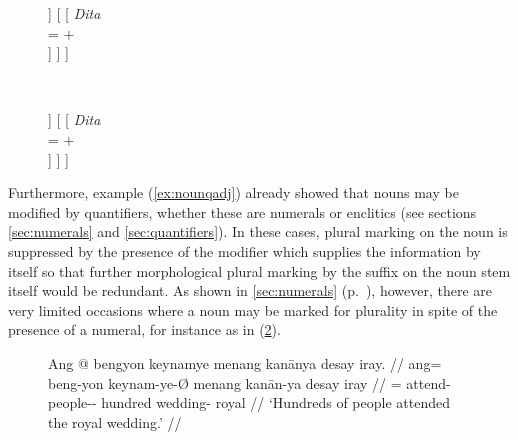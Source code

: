 \begin{figure}
\ex\label{ex:animcaseagrname}
\begin{minipage}[t]{.5\remaining}
\tl\quad\label{ex:animokname} %
\begin{forest}
[\anno{\xhead{N}}
	[\anno{Cl}
		[{%
			\textit{ang} \\
			\ups{\Anim} = $+$ \\
			\ups{\Case} = \Aarg{} \\
		}]
	]
	[
		[{%
			\textit{Dita} \\
			\ups{\Anim} = $+$ \\
		}]
	]
]
\end{forest}
\end{minipage}
~
\begin{minipage}[t]{.5\remaining}
\tl\quad\label{ex:animclashname} %
\ljudge*\begin{forest}
[\anno{\xhead{N}}
	[\anno{Cl}
		[{%
			\textit{eng} \\
			\ups{\Anim} = $-$ \\
			\ups{\Case} = \Aarg{} \\
		}]
	]
	[
		[{%
			\textit{Dita} \\
			\ups{\Anim} = $+$ \\
		}]
	]
]
\end{forest}
\end{minipage}
\xe
\end{figure}

Furthermore, example (\ref{ex:nounqadj}) already showed that nouns may be
modified by quantifiers, whether these are numerals
or enclitics (see sections \ref{sec:numerals} and \ref{sec:quantifiers}). In these
cases, plural marking on the noun is suppressed by the presence of the modifier
which supplies the information by itself so that further morphological plural
marking by the suffix  on the noun stem itself would be
redundant. As shown in \autoref{sec:numerals} (p.~\pageref{hundreds}), however,
there are very limited occasions where a noun may be marked for plurality in
spite of the presence of a numeral, for instance as in (\ref{ex:plovermkg}).

\begin{figure}
\ex\label{ex:plovermkg}\begingl
	\gla Ang @ bengyon keynamye menang kanānya {desay iray}. //
	\glb ang= beng-yon keynam-ye-Ø menang kanān-ya {desay iray} //
	\glc \AgtT{}= attend-\TplN{} people-\Pl{}-\Top{} hundred wedding-\Loc{} 
		royal //
	\glft `Hundreds of people attended the royal wedding.' //
\endgl\xe
\end{figure}

